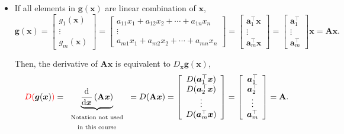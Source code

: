 \documentclass[12pt,thmsa]{article}
\begin{document}
\newpage
	
\begin{itemize}
	\item If all elements in \(\boldsymbol{g}( \boldsymbol{x} )\) are linear combination of \(\boldsymbol{x}\),
	\[ \boldsymbol{g}( \boldsymbol{x} )
	=\left[
	\begin{array}{c}{
			g_{1}(\boldsymbol{x})} \\ 
		{\vdots} \\ 
		{g_{m}(\boldsymbol{x})}
	\end{array}
	\right]
	=\left[
	\begin{array}{c}{
			a_{11} x_{1}+a_{12} x_{2}+\cdots+a_{1 n} x_{n}} \\ 
		{\vdots} \\ 
		{a_{m 1} x_{1}+a_{m 2} x_{2}+\cdots+a_{m n} x_{n}}
	\end{array}
	\right]
	=\left[
	\begin{array}{c}{
			\boldsymbol{a}_{1}^{\top} \boldsymbol{x}} \\ 
		{\vdots} \\ 
		{\boldsymbol{a}_{m}^{\top}\boldsymbol{x}}
	\end{array}
	\right]
	=\left[
	\begin{array}{c}{\boldsymbol{a}_{1}^{\top}} \\ {\vdots} \\ {\boldsymbol{a}_{m}^{\top}}\end{array}
	\right] \boldsymbol{x}
	= \mathbf{A} \boldsymbol{x}.
	\]
	
	Then, the derivative of \(\mathbf{A} \boldsymbol{x}\) is equivalent to \( D_{\boldsymbol{x}} \boldsymbol{g}( \boldsymbol{x} ) \),
	\[ {\color{red}D( } \boldsymbol{g}( \boldsymbol{x} ) {\color{red}{ ) }} 
	= \underbrace{\frac{\mathrm{d}}{\mathrm{d} \boldsymbol{x}} \left(  \mathbf{A} \boldsymbol{x} \right)}_{\text{\begin{tabular}{c} Notation not used \\ in this course \end{tabular}}}
	= {\color{black}{ D( }} \mathbf{A} \boldsymbol{x} {\color{black}{ ) }} 
	= \left[
		\begin{array}{c}
			{\color{black}{D(}}{ \boldsymbol{a}_{1}^{\top} \boldsymbol{x} }{\color{black})} \\
			{\color{black}{D(}}{ \boldsymbol{a}_{2}^{\top} \boldsymbol{x} }{\color{black})} \\
			\vdots \\
			{\color{black}{D(}}{ \boldsymbol{a}_{m}^{\top} \boldsymbol{x} }{\color{black})}
		\end{array}
		\right]
	= \left[
		\begin{array}{c}
			\boldsymbol{a}_{1}^{\top}\\
			\boldsymbol{a}_{2}^{\top}\\
			\vdots \\
			\boldsymbol{a}_{m}^{\top}
		\end{array}
		\right]
	= \mathbf{A}.
	\]
	

\end{itemize}
\end{document}

